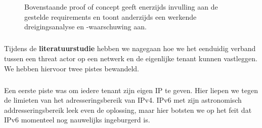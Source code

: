 
\chapter{}%
\label{ch:methodologie}


\begin{figure}[!htbp]
    
    \caption[Requirements and Capability]{Bovenstaande proof of concept geeft enerzijds invulling aan de gestelde requirements en toont anderzijds een werkende dreigingsanalyse en -waarschuwing aan.}
    \label{fig:RequirementsCapability}
\end{figure}

\paragraph{}
Tijdens de \textbf{literatuurstudie} hebben we nagegaan hoe we het eenduidig verband tussen een threat actor op een netwerk en de eigenlijke tenant kunnen vastleggen. We hebben hiervoor twee pistes bewandeld.

\paragraph{}
Een eerste piste was om iedere tenant zijn eigen IP te geven. Hier liepen we tegen de limieten van het adresseringsbereik van IPv4. IPv6 met zijn astronomisch addresseringsbereik leek even de oplossing, maar hier botsten we op het feit dat IPv6 momenteel nog nauwelijks ingeburgerd is.

